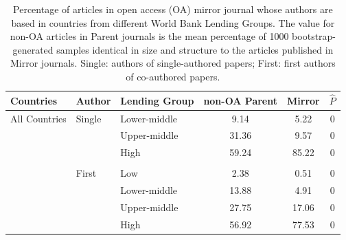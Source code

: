 \documentclass[
  english,
  man]{apa6}
\begin{document}
\begin{table}

\caption{\label{tab:Table5}Percentage of articles in open access (OA) mirror journal whose authors are based in countries from different World Bank Lending Groups. The value for non-OA articles in Parent journals is the mean percentage of 1000 bootstrap-generated samples identical in size and structure to the articles published in Mirror journals. Single: authors of single-authored papers; First: first authors of co-authored papers.}
\centering
\fontsize{12}{14}\selectfont
\begin{tabular}[t]{lllccc}
\toprule
Countries & Author & Lending Group & non-OA Parent & Mirror & $\hat{P}$\\
\midrule
All Countries & Single & Lower-middle & 9.14 & 5.22 & 0\\
 &  & Upper-middle & 31.36 & 9.57 & 0\\
 &  & High & 59.24 & 85.22 & 0\\
 &  &  &  &  & \\
 & First & Low & 2.38 & 0.51 & 0\\
 &  & Lower-middle & 13.88 & 4.91 & 0\\
 &  & Upper-middle & 27.75 & 17.06 & 0\\
 &  & High & 56.92 & 77.53 & 0\\
\bottomrule
\end{tabular}
\end{table}


\clearpage
\makeatletter
\efloat@restorefloats
\makeatother
\end{document}
